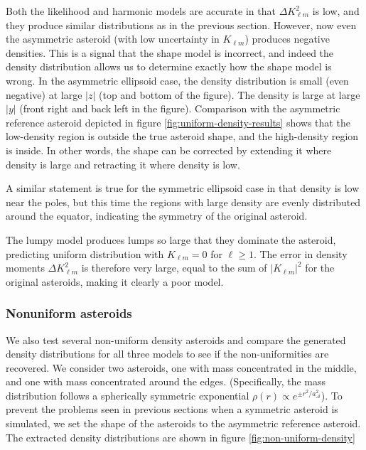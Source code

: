 \documentclass[fleqn,usenatbib]{mnras}
\begin{document}
Both the likelihood and harmonic models are accurate in that $\Delta K_{\ell m}^2$ is low, and they produce similar distributions as in the previous section. However, now even the asymmetric asteroid (with low uncertainty in $K_{\ell m}$) produces negative densities. This is a signal that the shape model is incorrect, and indeed the density distribution allows us to determine exactly how the shape model is wrong. In the asymmetric ellipsoid case, the density distribution is small (even negative) at large $|z|$ (top and bottom of the figure). The density is large at large $|y|$ (front right and back left in the figure). Comparison with the asymmetric reference asteroid depicted in figure \ref{fig:uniform-density-results} shows that the low-density region is outside the true asteroid shape, and the high-density region is inside. In other words, the shape can be corrected by extending it where density is large and retracting it where density is low.

A similar statement is true for the symmetric ellipsoid case in that density is low near the poles, but this time the regions with large density are evenly distributed around the equator, indicating the symmetry of the original asteroid.

The lumpy model produces lumps so large that they dominate the asteroid, predicting uniform distribution with $K_{\ell m} = 0$ for $\ell \geq 1$. The error in density moments $\Delta K_{\ell m}^2$ is therefore very large, equal to the sum of $|K_{\ell m}|^2$ for the original asteroids, making it clearly a poor model.


\subsubsection{Nonuniform asteroids}
\label{sec:non-uniform-density}

We also test several non-uniform density asteroids and compare the generated density distributions for all three models to see if the non-uniformities are recovered. We consider two asteroids, one with mass concentrated in the middle, and one with mass concentrated around the edges. (Specifically, the mass distribution follows a spherically symmetric exponential $\rho(r) \propto e^{\pm r^2/a_\mathcal{A}^2}$). To prevent the problems seen in previous sections when a symmetric asteroid is simulated, we set the shape of the asteroids to the asymmetric reference asteroid. The extracted density distributions are shown in figure \ref{fig:non-uniform-density}
\end{document}
